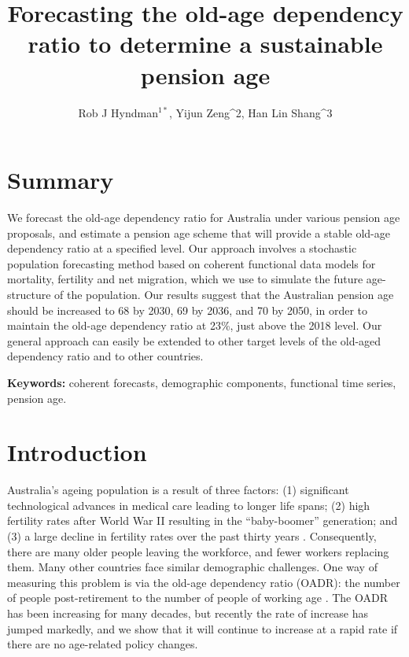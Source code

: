 \documentclass[
  doublespace]{anzsauth}
\title{Forecasting the old-age dependency ratio to determine a sustainable pension age}
\author{Rob J Hyndman\(^{1*}\), Yijun Zeng\^{}2, Han Lin Shang\^{}3}
\date{}
\let\oldmaketitle\maketitle
\def\maketitle{\cleanlookdateon\oldmaketitle}
\begin{document}
\maketitle

\hypertarget{summary}{%
\section*{Summary}\label{summary}}

We forecast the old-age dependency ratio for Australia under various pension age proposals, and estimate a pension age scheme that will provide a stable old-age dependency ratio at a specified level. Our approach involves a stochastic population forecasting method based on coherent functional data models for mortality, fertility and net migration, which we use to simulate the future age-structure of the population. Our results suggest that the Australian pension age should be increased to 68 by 2030, 69 by 2036, and 70 by 2050, in order to maintain the old-age dependency ratio at 23\%, just above the 2018 level. Our general approach can easily be extended to other target levels of the old-aged dependency ratio and to other countries.

\textbf{Keywords:} coherent forecasts, demographic components, functional time series, pension age.

\hypertarget{introduction}{%
\section{Introduction}\label{introduction}}

Australia's ageing population is a result of three factors: (1) significant technological advances in medical care leading to longer life spans; (2) high fertility rates after World War II resulting in the ``baby-boomer'' generation; and (3) a large decline in fertility rates over the past thirty years \citep{Fehr2008}. Consequently, there are many older people leaving the workforce, and fewer workers replacing them. Many other countries face similar demographic challenges. One way of measuring this problem is via the old-age dependency ratio (OADR): the number of people post-retirement to the number of people of working age \citep{Walker1982}. The OADR has been increasing for many decades, but recently the rate of increase has jumped markedly, and we show that it will continue to increase at a rapid rate if there are no age-related policy changes.
\end{document}
